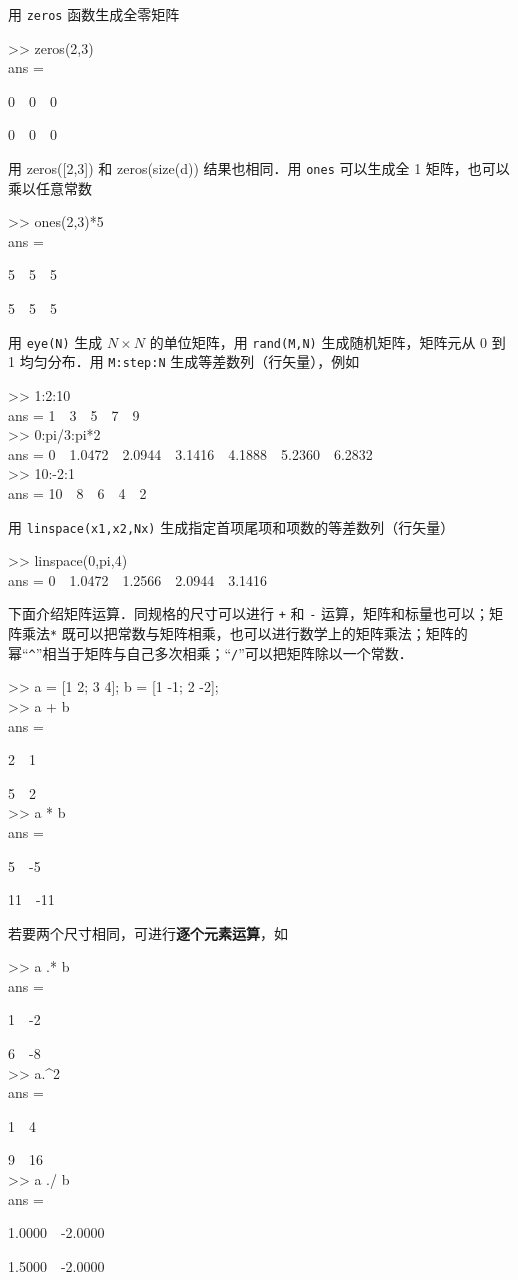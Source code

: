 用 \texttt{zeros} 函数生成全零矩阵
\begin{Command}
>> zeros(2,3) \\
ans = \par
0\ \ 0\ \ 0 \par
0\ \ 0\ \ 0
\end{Command}
用 zeros([2,3]) 和 zeros(size(d)) 结果也相同．用 \texttt{ones} 可以生成全 1 矩阵，也可以乘以任意常数
\begin{Command}
>> ones(2,3)*5 \\
ans = \par
5\ \ 5\ \ 5 \par
5\ \ 5\ \ 5
\end{Command}
用 \texttt{eye(N)} 生成 $N\times N$ 的单位矩阵，用 \texttt{rand(M,N)} 生成随机矩阵，矩阵元从 0 到 1 均匀分布．用 \texttt{M:step:N} 生成等差数列（行矢量），例如
\begin{Command}
>> 1:2:10 \\
ans = 1\ \ 3\ \ 5\ \ 7\ \ 9 \\
>> 0:pi/3:pi*2 \\
ans = 0\ \ 1.0472\ \ 2.0944\ \ 3.1416\ \ 4.1888\ \ 5.2360\ \ 6.2832 \\
>> 10:-2:1 \\
ans = 10\ \ 8\ \ 6\ \ 4\ \ 2
\end{Command}
用 \texttt{linspace(x1,x2,Nx)} 生成指定首项尾项和项数的等差数列（行矢量）
\begin{Command}
>> linspace(0,pi,4) \\
ans = 0\ \ 1.0472\ \ 1.2566\ \ 2.0944\ \ 3.1416
\end{Command}
下面介绍矩阵运算．同规格的尺寸可以进行 \texttt{+} 和 \texttt{-} 运算，矩阵和标量也可以；矩阵乘法\texttt{*} 既可以把常数与矩阵相乘，也可以进行数学上的矩阵乘法；矩阵的幂“\texttt{\^{}}”相当于矩阵与自己多次相乘；“\texttt{/}”可以把矩阵除以一个常数．
\begin{Command}
>> a = [1 2; 3 4]; b = [1 -1; 2 -2]; \\
>> a + b \\
ans = \par
2\ \ 1 \par
5\ \ 2\\
>> a * b \\
ans = \par
5\ \ -5 \par
11\ \ -11
\end{Command}
若要两个尺寸相同，可进行\textbf{逐个元素运算}，如
\begin{Command}
>> a .* b \\
ans = \par
1\ \ -2 \par
6\ \ -8\\
>> a.\^{}2 \\
ans = \par
1\ \ 4 \par
9\ \ 16 \\
>> a ./ b \\
ans = \par
1.0000\ \ -2.0000 \par
1.5000\ \ -2.0000
\end{Command}
